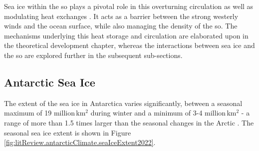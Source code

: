 Sea ice within the \acs{so} plays a pivotal role in this overturning circulation as well as modulating heat exchanges \cite{Massom2010}. It acts as a barrier between the strong westerly winds and the ocean surface, while also managing the density of the \acs{so}. The mechanisms underlying this heat storage and circulation are elaborated upon in the theoretical development chapter, whereas the interactions between sea ice and the \acs{so} are explored further in the subsequent sub-sections.


\subsection{Antarctic Sea Ice} \label{subsec:litreview.antarctica.seaIce}

The extent of the sea ice in Antarctica varies significantly, between a seasonal maximum of 19 million\,km$^2$ during winter and a minimum of 3-4 million\,km$^2$ - a range of more than 1.5 times larger than the seasonal changes in the Arctic \cite{Thomas2017Chap8}. The seasonal sea ice extent is shown in Figure \ref{fig:litReview.antarcticClimate.seaIceExtent2022}. %

